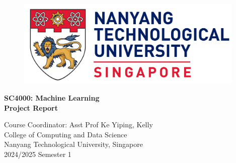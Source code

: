 \begin{titlepage}
	\begin{figure}[!t]
		\centering
		\includegraphics[width = 4.3in]{title/logo.pdf}
	\end{figure}

	\centering
	\huge{\textbf{SC4000: Machine Learning}}\\[0.2in]
	\huge{\textbf{Project Report}}\\[2in]


	\begin{table}[h]
		\centering
	\end{table}

	\Large{Course Coordinator: Asst Prof Ke Yiping, Kelly}\\[0.5in]


	\LARGE{College of Computing and Data Science}\\
	\LARGE{Nanyang Technological University, Singapore}\\[0.3in]


	\LARGE{2024/2025 Semester 1}
	\newpage
\end{titlepage}
